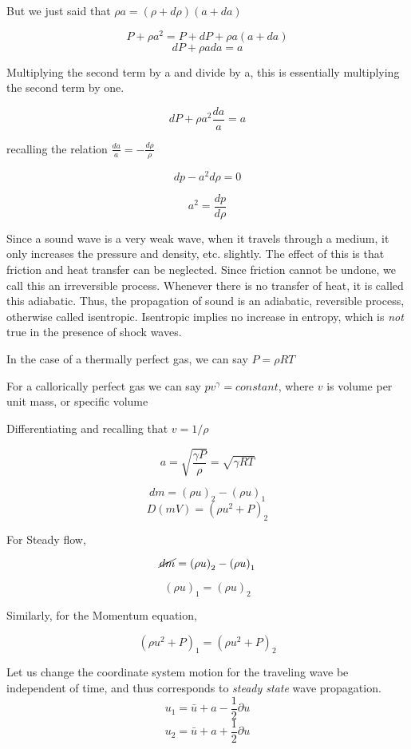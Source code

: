 But we just said that $\rho a = (\rho + d\rho)(a + da)$


\[P + \rho a^2  = P + dP +  \rho a(a + da) \]
\[dP + \rho ada = a\]

Multiplying the second term by a and divide by a, this is essentially multiplying the second term by one.

\[dP + \rho a^2\frac{da}{a} = a\]

recalling the relation $\frac{da}{a} = -\frac{d \rho}{\rho}$

\[dp - a^2 d \rho = 0\]

                       \[a^2 = \frac{dp}{d\rho}\]

Since a sound wave is a very weak wave, when it travels through a medium, it only increases the pressure and density, etc. slightly. The effect of this is that friction  and heat transfer can be neglected. Since friction cannot be undone, we call this an irreversible process. Whenever there is no transfer of heat, it is called this adiabatic. Thus, the propagation of sound is an adiabatic, reversible process, otherwise called isentropic. Isentropic implies no increase in entropy, which is \textit{not} true in the presence of shock waves.

In the case of a thermally perfect gas, we can say $P = \rho R T$

For a callorically perfect gas we can say $pv^{\gamma} = constant$, where $v$ is volume per unit mass, or specific volume

Differentiating and recalling that $v = 1/\rho$

\[a = \sqrt{\frac{\gamma P}{\rho}} = \sqrt{\gamma R T}\]


\[dm = \left( \rho u\right)_2 - \left(\rho u\right)_1\]
\[D(mV) = \left(\rho u^2 + P \right)_2\]

For Steady flow,

\[\cancel{dm} = \left( \rho u\right)_2 - \left(\rho u\right)_1\]

\[ \left( \rho u\right)_1 = \left(\rho u\right)_2\]

Similarly, for the Momentum equation,

\[\left(\rho u^2 + P\right)_1 = \left(\rho u^2 + P\right)_2\]

Let us change the coordinate system motion for the traveling wave be independent of time, and thus corresponds to \textit{steady state} wave propagation. 
\[ u_1 = \bar{u} + a - \frac{1}{2} \partial u \]
\[ u_2 = \bar{u} + a + \frac{1}{2} \partial u \]


